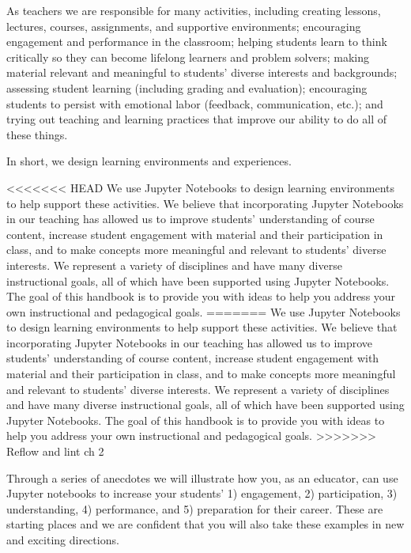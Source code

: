 \documentclass[]{book}
\begin{document}
As teachers we are responsible for many activities, including creating
lessons, lectures, courses, assignments, and supportive environments;
encouraging engagement and performance in the classroom; helping
students learn to think critically so they can become lifelong learners
and problem solvers; making material relevant and meaningful to
students' diverse interests and backgrounds; assessing student learning
(including grading and evaluation); encouraging students to persist with
emotional labor (feedback, communication, etc.); and trying out teaching
and learning practices that improve our ability to do all of these
things.

In short, we design learning environments and experiences.

\textless{}\textless{}\textless{}\textless{}\textless{}\textless{}\textless{}
HEAD We use Jupyter Notebooks to design learning environments to help
support these activities. We believe that incorporating Jupyter
Notebooks in our teaching has allowed us to improve students'
understanding of course content, increase student engagement with
material and their participation in class, and to make concepts more
meaningful and relevant to students' diverse interests. We represent a
variety of disciplines and have many diverse instructional goals, all of
which have been supported using Jupyter Notebooks. The goal of this
handbook is to provide you with ideas to help you address your own
instructional and pedagogical goals. ======= We use Jupyter Notebooks to
design learning environments to help support these activities. We
believe that incorporating Jupyter Notebooks in our teaching has allowed
us to improve students' understanding of course content, increase
student engagement with material and their participation in class, and
to make concepts more meaningful and relevant to students' diverse
interests. We represent a variety of disciplines and have many diverse
instructional goals, all of which have been supported using Jupyter
Notebooks. The goal of this handbook is to provide you with ideas to
help you address your own instructional and pedagogical goals.
\textgreater{}\textgreater{}\textgreater{}\textgreater{}\textgreater{}\textgreater{}\textgreater{}
Reflow and lint ch 2

Through a series of anecdotes we will illustrate how you, as an
educator, can use Jupyter notebooks to increase your students' 1)
engagement, 2) participation, 3) understanding, 4) performance, and 5)
preparation for their career. These are starting places and we are
confident that you will also take these examples in new and exciting
directions.
\end{document}
